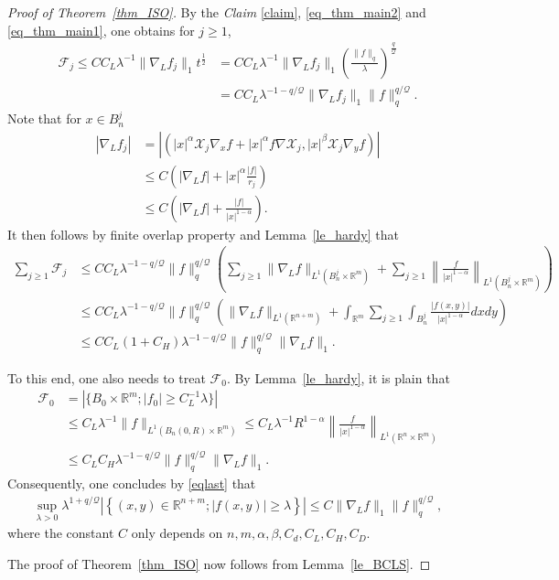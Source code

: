\documentclass[12pt]{amsart}
\theoremstyle{plain}
\theoremstyle{definition}
\numberwithin{equation}{section}
\begin{document}
\begin{proof}[Proof of Theorem~\ref{thm_ISO}]
\medskip


By the \textit{Claim} \eqref{claim}, \eqref{eq_thm_main2} and \eqref{eq_thm_main1}, one obtains for $j\ge 1$,
\begin{align*}
    \mathcal{F}_j \le C C_L\lambda^{-1} \|\nabla_L f_j\|_1 t^{\frac{1}{2}} &= CC_L \lambda^{-1} \|\nabla_L f_j\|_1 \left(\frac{\|f\|_q}{\lambda}\right)^{\frac{q}{\mathcal{Q}}} \\
    &= CC_L \lambda^{-1-q/\mathcal{Q}} \|\nabla_L f_j\|_1 \|f\|_q^{q/\mathcal{Q}}.
\end{align*}
Note that for $x\in B_n^j$
\begin{align}
    |\nabla_L f_j| &= \left|\left( |x|^\alpha \mathcal{X}_j \nabla_xf  + |x|^\alpha f \nabla \mathcal{X}_j, |x|^\beta \mathcal{X}_j \nabla_yf \right)\right|\\ \nonumber&\le C \left( |\nabla_L f| + |x|^\alpha \frac{|f|}{r_j} \right)\\ \nonumber
    &\le C \left(|\nabla_L f| + \frac{|f|}{|x|^{1-\alpha}}\right).
\end{align}
It then follows by finite overlap property and Lemma~\ref{le_hardy} that
\begin{align*}
\sum_{j \ge 1} \mathcal{F}_j &\le CC_L \lambda^{-1-q/\mathcal{Q}} \|f\|_q^{q/\mathcal{Q}} \left( \sum_{j \ge 1} \|\nabla_L f\|_{L^1(B_n^j \times \mathbb{R}^m)} +  \sum_{j \ge 1} \left\|\frac{f}{|x|^{1-\alpha}}\right\|_{L^1(B_n^j \times \mathbb{R}^m)} \right)\\
&\le CC_L \lambda^{-1-q/\mathcal{Q}} \|f\|_q^{q/\mathcal{Q}} \left( \|\nabla_L f\|_{L^1(\mathbb{R}^{n+m})} + \int_{\mathbb{R}^m} \sum_{j \ge 1} \int_{B_n^j} \frac{|f(x,y)|}{|x|^{1-\alpha}} dx dy \right)\\
&\le CC_L(1+C_H) \lambda^{-1-q/\mathcal{Q}} \|f\|_q^{q/\mathcal{Q}}\|\nabla_L f\|_1.
\end{align*}

To this end, one also needs to treat $\mathcal{F}_0$. By Lemma~\ref{le_hardy}, it is plain that
\begin{align*}
    \mathcal{F}_0 &= \left|\{B_{0}\times \mathbb{R}^m; |f_{0}|\ge C_L^{-1}\lambda\}\right|\\
    &\le C_L \lambda^{-1} \| f \|_{L^1\left(B_n(0,R)\times \mathbb{R}^m\right)} \le C_L \lambda^{-1} R^{1-\alpha} \left\| 
\frac{f}{|x|^{1-\alpha}} \right\|_{L^1(\mathbb{R}^n \times \mathbb{R}^m)}\\
&\le C_LC_H \lambda^{-1-q/\mathcal{Q}} \|f\|_q^{q/\mathcal{Q}}\|\nabla_L f\|_1.
\end{align*}
Consequently, one concludes by \eqref{eqlast} that
\begin{align*}
    \sup_{\lambda>0} \lambda^{1+q/\mathcal{Q}} \left|\left\{ (x,y)\in \mathbb{R}^{n+m}; |f(x,y)|\ge \lambda \right\}\right| \le C \|\nabla_L f\|_1 \|f\|_q^{q/\mathcal{Q}},
\end{align*}
where the constant $C$ only depends on $n,m,\alpha,\beta,C_d,C_L,C_H,C_D$. 

The proof of Theorem~\ref{thm_ISO} now follows from Lemma~\ref{le_BCLS}.
\end{proof}
\end{document}
